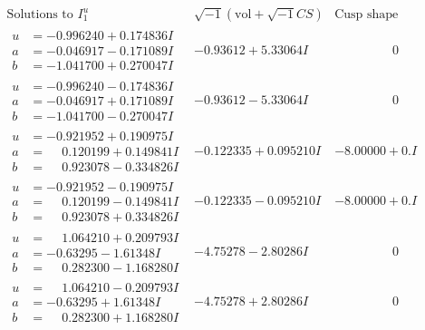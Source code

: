 \documentclass[1p]{elsarticle_modified}
\theoremstyle{definition}
\newcommand{\I}{\sqrt{-1}}
\begin{document}
$$\begin{array}{c|c|c}  
\text{Solutions to }I^u_{1}& \I (\text{vol} + \sqrt{-1}CS) & \text{Cusp shape}\\
 \hline 
\begin{aligned}
u &= -0.996240 + 0.174836 I \\
a &= -0.046917 - 0.171089 I \\
b &= -1.041700 + 0.270047 I\end{aligned}
 & -0.93612 + 5.33064 I & \phantom{-0.000000 } 0 \\ \hline\begin{aligned}
u &= -0.996240 - 0.174836 I \\
a &= -0.046917 + 0.171089 I \\
b &= -1.041700 - 0.270047 I\end{aligned}
 & -0.93612 - 5.33064 I & \phantom{-0.000000 } 0 \\ \hline\begin{aligned}
u &= -0.921952 + 0.190975 I \\
a &= \phantom{-}0.120199 + 0.149841 I \\
b &= \phantom{-}0.923078 - 0.334826 I\end{aligned}
 & -0.122335 + 0.095210 I & -8.00000 + 0. I\phantom{ +0.000000I} \\ \hline\begin{aligned}
u &= -0.921952 - 0.190975 I \\
a &= \phantom{-}0.120199 - 0.149841 I \\
b &= \phantom{-}0.923078 + 0.334826 I\end{aligned}
 & -0.122335 - 0.095210 I & -8.00000 + 0. I\phantom{ +0.000000I} \\ \hline\begin{aligned}
u &= \phantom{-}1.064210 + 0.209793 I \\
a &= -0.63295 - 1.61348 I \\
b &= \phantom{-}0.282300 - 1.168280 I\end{aligned}
 & -4.75278 - 2.80286 I & \phantom{-0.000000 } 0 \\ \hline\begin{aligned}
u &= \phantom{-}1.064210 - 0.209793 I \\
a &= -0.63295 + 1.61348 I \\
b &= \phantom{-}0.282300 + 1.168280 I\end{aligned}
 & -4.75278 + 2.80286 I & \phantom{-0.000000 } 0 \\ \hline\begin{aligned}

\end{aligned}
\end{array}$$
\end{document}
